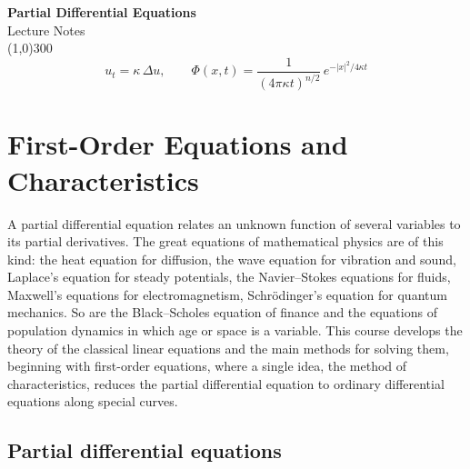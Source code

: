 \documentclass[11pt,a4paper]{article}
\numberwithin{equation}{section}
\theoremstyle{definition}
\begin{document}
\begin{titlepage}
\thispagestyle{empty}
\begin{center}
\vspace*{3cm}
{\Huge\bfseries Partial Differential Equations}\\[1.2cm]
{\large Lecture Notes}\\[2.5cm]
\line(1,0){300}\\[1.5cm]
$$u_t=\kappa\,\Delta u,\qquad \Phi(x,t)=\frac{1}{(4\pi\kappa t)^{n/2}}\,e^{-|x|^2/4\kappa t}$$
\end{center}
\end{titlepage}

\tableofcontents
\thispagestyle{empty}
\clearpage
\setcounter{page}{1}

\section{First-Order Equations and Characteristics}
\label{sec:characteristics}

A partial differential equation relates an unknown function of several variables to its partial derivatives. The great equations of mathematical
physics are of this kind: the heat equation for diffusion, the wave equation for vibration and sound, Laplace's equation for steady potentials,
the Navier--Stokes equations for fluids, Maxwell's equations for electromagnetism, Schr\"odinger's equation for quantum mechanics. So are the
Black--Scholes equation of finance and the equations of population dynamics in which age or space is a variable. This course develops the theory
of the classical linear equations and the main methods for solving them, beginning with first-order equations, where a single idea, the method of
characteristics, reduces the partial differential equation to ordinary differential equations along special curves.

\subsection{Partial differential equations}
\label{ssec:pdeintro}
\end{document}
